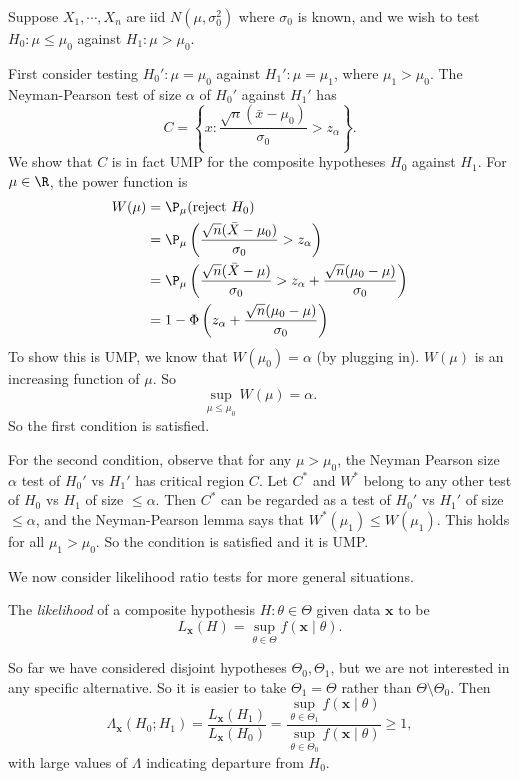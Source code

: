 \documentclass[a4paper]{article}
\begin{document}
\begin{eg}
  Suppose $X_1, \cdots, X_n$ are iid $N(\mu, \sigma_0^2)$ where $\sigma_0$ is known, and we wish to test $H_0: \mu\leq \mu_0$ against $H_1: \mu > \mu_0$.

  First consider testing $H_0': \mu = \mu_0$ against $H_1': \mu = \mu_1$, where $\mu_1 > \mu_0$. The Neyman-Pearson test of size $\alpha$ of $H_0'$ against $H_1'$ has
  \[
    C = \left\{x: \frac{\sqrt{n}(\bar x - \mu_0)}{\sigma_0} > z_\alpha\right\}.
  \]
  We show that $C$ is in fact UMP for the composite hypotheses $H_0$ against $H_1$. For $\mu\in \R$, the power function is
  \begin{align*}
    W(\mu) &= \P_\mu(\text{reject } H_0)\\
    &= \P_\mu\left(\frac{\sqrt{n}(\bar X - \mu_0)}{\sigma_0} > z_\alpha\right)\\
    &= \P_\mu\left(\frac{\sqrt{n}(\bar X - \mu)}{\sigma_0} > z_\alpha + \frac{\sqrt{n}(\mu_0 - \mu)}{\sigma_0}\right)\\
    &= 1 - \Phi\left(z_\alpha + \frac{\sqrt{n}(\mu_0 - \mu)}{\sigma_0}\right)
  \end{align*}
  To show this is UMP, we know that $W(\mu_0) = \alpha$ (by plugging in). $W(\mu)$ is an increasing function of $\mu$. So
  \[
    \sup_{ \mu \leq \mu_0} W(\mu) = \alpha.
  \]
  So the first condition is satisfied.

  For the second condition, observe that for any $\mu > \mu_0$, the Neyman Pearson size $\alpha$ test of $H_0'$ vs $H_1'$ has critical region $C$. Let $C^*$ and $W^*$ belong to any other test of $H_0$ vs $H_1$ of size $\leq \alpha$. Then $C^*$ can be regarded as a test of $H_0'$ vs $H_1'$ of size $\leq \alpha$, and the Neyman-Pearson lemma says that $W^*(\mu_1) \leq W(\mu_1)$. This holds for all $\mu_1 > \mu_0$. So the condition is satisfied and it is UMP.
\end{eg}
We now consider likelihood ratio tests for more general situations.
\begin{defi}
  The \emph{likelihood} of a composite hypothesis $H:\theta\in \Theta$ given data $\mathbf{x}$ to be
  \[
    L_{\mathbf{x}}(H) = \sup_{\theta\in \Theta}f(\mathbf{x}\mid \theta).
  \]
\end{defi}
So far we have considered disjoint hypotheses $\Theta_0, \Theta_1$, but we are not interested in any specific alternative. So it is easier to take $\Theta_1 = \Theta$ rather than $\Theta \setminus\Theta_0$. Then
\[
  \Lambda_\mathbf{x} (H_0; H_1) = \frac{L_\mathbf{x}(H_1)}{L_\mathbf{x}(H_0)}=\frac{\sup_{\theta\in \Theta_1}f(\mathbf{x}\mid \theta)}{\sup_{\theta\in \Theta_0}f(\mathbf{x}\mid \theta)} \geq 1,
\]
with large values of $\Lambda$ indicating departure from $H_0$.
\end{document}
